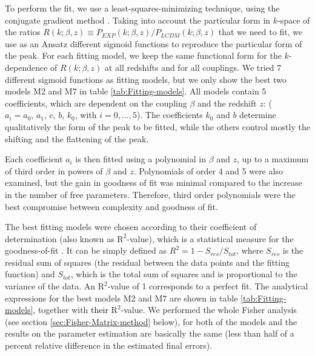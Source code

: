 To perform the fit, we use a least-squares-minimizing technique, using
the conjugate gradient method \cite{weisstein_least_????}. Taking
into account the particular form in $k$-space of the ratios $R(k;\beta,z)\equiv P_{EXP}(k;\beta,z)/P_{LCDM}(k;\beta,z)$
that we need to fit, we use as an Ansatz different sigmoid functions
to reproduce the particular form of the peak. For each fitting model,
we keep the same functional form for the $k$-dependence of $R(k;\beta,z)$
at all redshifts and for all couplings. We tried 7 different sigmoid
functions as fitting models, but we only show the best two models
M2 and M7 in table \ref{tab:Fitting-models}. All models contain 5
coefficients, which are dependent on the coupling $\beta$ and the
redshift $z$: ($a_{i}=a_{0},\, a_{1},\, c,\, b,\, k_{0}$, with $i=0,...,5$).
The coefficients $k_{0}$ and $b$ determine qualitatively the form
of the peak to be fitted, while the others control mostly the shifting
and the flattening of the peak.

Each coefficient $a_{i}$ is then fitted using a polynomial in $\beta$
and $z$, up to a maximum of third order in powers of $\beta$ and
$z$. Polynomials of order 4 and 5 were also examined, but the gain
in goodness of fit was minimal compared to the increase in the number
of free parameters. Therefore, third order polynomials were the best
compromise between complexity and goodness of fit.

The best fitting models were chosen according to their coefficient
of determination (also known as $\mbox{R}^{2}$-value), which is a
statistical measure for the goodness-of-fit \textcolor{green}{\cite{weisstein_correlation_????}}.
It can be simply defined as $R^{2}=1-S_{res}/S_{tot}$, where $S_{res}$
is the residual sum of squares (the residual between the data points
and the fitting function) and $S_{tot}$, which is the total sum of
squares and is proportional to the variance of the data. An $\mbox{R}^{2}$-value
of 1 corresponds to a perfect fit. The analytical expressions for
the best models M2 and M7 are shown in table \ref{tab:Fitting-models},
together with \textcolor{black}{their} $\mbox{R}^{2}$-value. We performed
the whole Fisher analysis (see section \ref{sec:Fisher-Matrix-method}
below), for both of the models and the results on the parameter estimation
are basically the same (less than half of a percent relative difference
in the estimated final errors).


